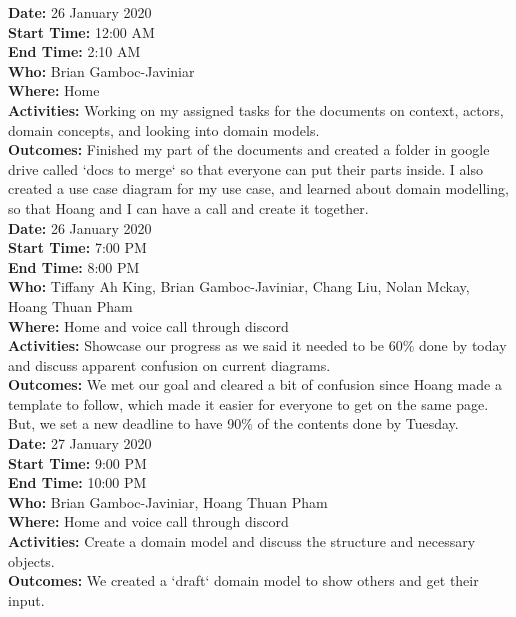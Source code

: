 \documentclass[12pt]{article}
\begin{document}
{\bf Date:} 26 January 2020\\
{\bf Start Time:} 12:00 AM\\
{\bf End Time:} 2:10 AM \\
{\bf Who:} Brian Gamboc-Javiniar\\
{\bf Where:} Home \\
{\bf Activities:} Working on my assigned tasks for the documents on context, actors, domain concepts, and looking into domain models.\\
{\bf Outcomes:} Finished my part of the documents and created a folder in google drive called `docs to merge` so that everyone can put their parts inside. I also created a use case diagram for my use case, and learned about domain modelling, so that Hoang and I can have a call and create it together.\\

{\bf Date:} 26 January 2020\\
{\bf Start Time:} 7:00 PM\\
{\bf End Time:} 8:00 PM \\
{\bf Who:} Tiffany Ah King, Brian Gamboc-Javiniar, Chang Liu, Nolan Mckay, Hoang Thuan Pham\\
{\bf Where:} Home and voice call through discord \\
{\bf Activities:} Showcase our progress as we said it needed to be 60\% done by today and discuss apparent confusion on current diagrams.\\
{\bf Outcomes:} We met our goal and cleared a bit of confusion since Hoang made a template to follow, which made it easier for everyone to get on the same page. But, we set a new deadline to have 90\% of the contents done by Tuesday.\\

{\bf Date:} 27 January 2020\\
{\bf Start Time:} 9:00 PM\\
{\bf End Time:} 10:00 PM \\
{\bf Who:} Brian Gamboc-Javiniar, Hoang Thuan Pham\\
{\bf Where:} Home and voice call through discord \\
{\bf Activities:} Create a domain model and discuss the structure and necessary objects.\\
{\bf Outcomes:} We created a `draft` domain model to show others and get their input.\\
\end{document}
